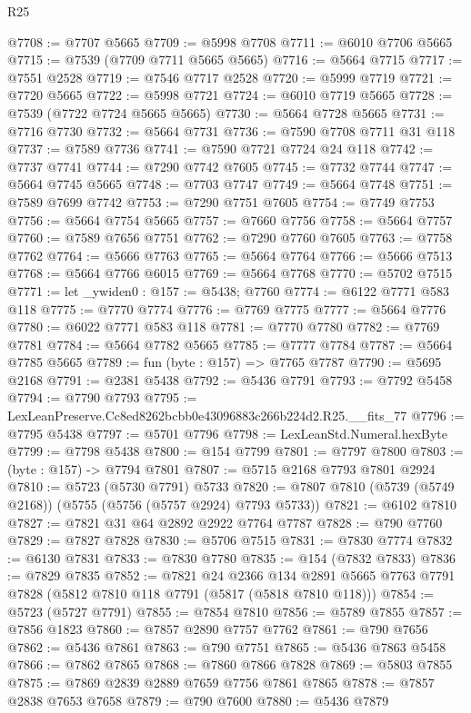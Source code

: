\begin{lexlean}{R25}
\begin{coremodule}
@7708 := @7707 @5665
@7709 := @5998 @7708
@7711 := @6010 @7706 @5665
@7715 := @7539 (@7709 @7711 @5665 @5665)
@7716 := @5664 @7715
@7717 := @7551 @2528
@7719 := @7546 @7717 @2528
@7720 := @5999 @7719
@7721 := @7720 @5665
@7722 := @5998 @7721
@7724 := @6010 @7719 @5665
@7728 := @7539 (@7722 @7724 @5665 @5665)
@7730 := @5664 @7728 @5665
@7731 := @7716 @7730
@7732 := @5664 @7731
@7736 := @7590 @7708 @7711 @31 @118
@7737 := @7589 @7736
@7741 := @7590 @7721 @7724 @24 @118
@7742 := @7737 @7741
@7744 := @7290 @7742 @7605
@7745 := @7732 @7744
@7747 := @5664 @7745 @5665
@7748 := @7703 @7747
@7749 := @5664 @7748
@7751 := @7589 @7699 @7742
@7753 := @7290 @7751 @7605
@7754 := @7749 @7753
@7756 := @5664 @7754 @5665
@7757 := @7660 @7756
@7758 := @5664 @7757
@7760 := @7589 @7656 @7751
@7762 := @7290 @7760 @7605
@7763 := @7758 @7762
@7764 := @5666 @7763
@7765 := @5664 @7764
@7766 := @5666 @7513
@7768 := @5664 @7766 @6015
@7769 := @5664 @7768
@7770 := @5702 @7515
@7771 := let _ywiden0 : @157 := @5438; @7760
@7774 := @6122 @7771 @583 @118
@7775 := @7770 @7774
@7776 := @7769 @7775
@7777 := @5664 @7776
@7780 := @6022 @7771 @583 @118
@7781 := @7770 @7780
@7782 := @7769 @7781
@7784 := @5664 @7782 @5665
@7785 := @7777 @7784
@7787 := @5664 @7785 @5665
@7789 := fun (byte : @157) => @7765 @7787
@7790 := @5695 @2168
@7791 := @2381 @5438
@7792 := @5436 @7791
@7793 := @7792 @5458
@7794 := @7790 @7793
@7795 := LexLeanPreserve.Cc8ed8262bcbb0e43096883c266b224d2.R25.__fits_77
@7796 := @7795 @5438
@7797 := @5701 @7796
@7798 := LexLeanStd.Numeral.hexByte
@7799 := @7798 @5438
@7800 := @154 @7799
@7801 := @7797 @7800
@7803 := (byte : @157) -> @7794 @7801
@7807 := @5715 @2168 @7793 @7801 @2924
@7810 := @5723 (@5730 @7791) @5733
@7820 := @7807 @7810 (@5739 (@5749 @2168)) (@5755 (@5756 (@5757 @2924) @7793 @5733))
@7821 := @6102 @7810
@7827 := @7821 @31 @64 @2892 @2922 @7764 @7787
@7828 := @790 @7760
@7829 := @7827 @7828
@7830 := @5706 @7515
@7831 := @7830 @7774
@7832 := @6130 @7831
@7833 := @7830 @7780
@7835 := @154 (@7832 @7833)
@7836 := @7829 @7835
@7852 := @7821
    @24
    @2366
    @134
    @2891
    @5665
    @7763
    @7791
    @7828
    (@5812 @7810 @118 @7791 (@5817 (@5818 @7810 @118)))
@7854 := @5723 (@5727 @7791)
@7855 := @7854 @7810
@7856 := @5789 @7855
@7857 := @7856 @1823
@7860 := @7857 @2890 @7757 @7762
@7861 := @790 @7656
@7862 := @5436 @7861
@7863 := @790 @7751
@7865 := @5436 @7863 @5458
@7866 := @7862 @7865
@7868 := @7860 @7866 @7828
@7869 := @5803 @7855
@7875 := @7869 @2839 @2889 @7659 @7756 @7861 @7865
@7878 := @7857 @2838 @7653 @7658
@7879 := @790 @7600
@7880 := @5436 @7879

\end{coremodule}
\end{lexlean}
